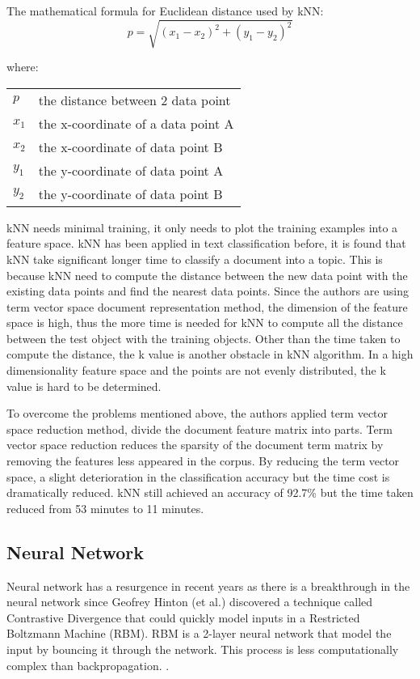 The mathematical formula for Euclidean distance used by kNN:
\begin{equation}
p = \sqrt{(x_{1} - x_{2})^{2} + (y_{1} - y_{2})^{2}}
\end{equation}

where:
\begin{center}
	\begin{tabular}{l @{ $=$ } l}
		$p$ & the distance between 2 data point\\
		$x_{1}$ & the x-coordinate of a data point A\\
		$x_{2}$ & the x-coordinate of data point B\\
		$y_{1}$ & the y-coordinate of data point A\\
		$y_{2}$ & the y-coordinate of data point B\\
	\end{tabular}
\end{center}
	

kNN needs minimal training, it only needs to plot the training examples into a feature space. kNN has been applied in text classification before, it is found that kNN take significant longer time to classify a document into a topic. This is because kNN need to compute the distance between the new data point with the existing data points and find the nearest data points. Since the authors are using term vector space document representation method, the dimension of the feature space is high, thus the more time is needed for kNN to compute all the distance between the test object with the training objects. Other than the time taken to compute the distance, the k value is another obstacle in kNN algorithm. In a high dimensionality feature space and the points are not evenly distributed, the k value is hard to be determined.

To overcome the problems mentioned above, the authors applied term vector space reduction method, divide the document feature matrix into parts. Term vector space reduction reduces 
the sparsity of the document term matrix by removing the features less appeared in the corpus. By reducing the term vector space, a slight deterioration in the classification accuracy but the time cost is dramatically reduced. kNN still achieved an accuracy of 92.7\% but the time taken reduced from 53 minutes to 11 minutes. \cite{knnVectorSpaceReduction}

\clearpage
\subsection{Neural Network}
Neural network has a resurgence in recent years as there is a breakthrough in the neural network since Geofrey Hinton (et al.) discovered a technique called Contrastive Divergence that could quickly model inputs in a Restricted Boltzmann Machine (RBM). RBM is a 2-layer neural network that model the input by bouncing it through the network. This process is less computationally complex than backpropagation. \cite{nnHinton}.
	
